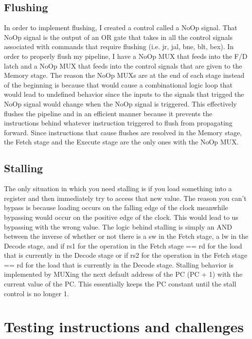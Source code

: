 \documentclass[letterpaper]{article} %
\begin{document}
    \subsection{Flushing}
        In order to implement flushing, I created a control called a NoOp signal. That NoOp signal is the output of an OR gate that takes in all the control signals associated with commands that require flushing (i.e. jr, jal, bne, blt, bex). In order to properly flush my pipeline, I have a NoOp MUX that feeds into the F/D latch and a NoOp MUX that feeds into the control signals that are given to the Memory stage. The reason the NoOp MUXs are at the end of each stage instead of the beginning is because that would cause a combinational logic loop that would lead to undefined behavior since the inputs to the signals that trigged the NoOp signal would change when the NoOp signal is triggered. This effectively flushes the pipeline and in an efficient manner because it prevents the instructions behind whatever instruction triggered to flush from propagating forward. Since instructions that cause flushes are resolved in the Memory stage, the Fetch stage and the Execute stage are the only ones with the NoOp MUX. 
    
    \subsection{Stalling}
        The only situation in which you need stalling is if you load something into a register and then immediately try to access that new value. The reason you can't bypass is because loading occurs on the falling edge of the clock meanwhile bypassing would occur on the positive edge of the clock. This would lead to us bypassing with the wrong value. The logic behind stalling is simply an AND between the inverse of whether or not there is a sw in the Fetch stage, a lw in the Decode stage, and if rs1 for the operation in the Fetch stage == rd for the load that is currently in the Decode stage or if rs2 for the operation in the Fetch stage == rd for the load that is currently in the Decode stage. Stalling behavior is implemented by MUXing the next default address of the PC (PC + 1) with the current value of the PC. This essentially keeps the PC constant until the stall control is no longer 1. 

\pagebreak

\section{Testing instructions and challenges}
\end{document}
